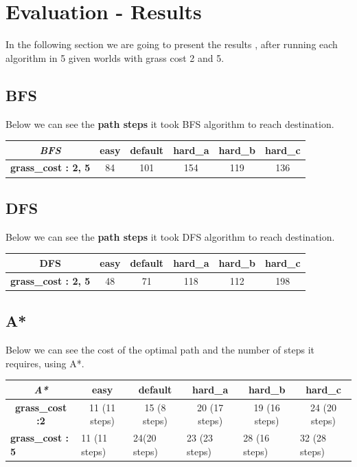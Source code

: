 \documentclass{article}
\begin{document}
    
\section{Evaluation - Results}
    In the following section we are going to present the results , after running each algorithm in 5 given worlds with grass cost 2 and 5.
\subsection{BFS}   
Below we can see the \textbf{path steps} it took BFS algorithm to reach destination.
\begin{table}[!htb]
\centering
\begin{tabular}{|c|c|c|c|c|c|}
\hline
\textit{\textbf{BFS}} & \textbf{easy} & \textbf{default} & \textbf{hard\_a} & \textbf{hard\_b} & \textbf{hard\_c} \\ \hline
\textbf{grass\_cost : 2, 5} & 84 & 101 & 154 & 119 & 136 \\ \hline
\end{tabular}
\end{table}

\subsection{DFS}
Below we can see the \textbf{path steps} it took DFS algorithm to reach destination.

\begin{table}[!htb]
\centering
\begin{tabular}{|c|c|c|c|c|c|}
\hline
\textbf{DFS}              & \textbf{easy} & \textbf{default} & \textbf{hard\_a} & \textbf{hard\_b} & \textbf{hard\_c} \\ \hline
\textbf{grass\_cost : 2, 5} & 48            & 71               & 118              & 112              & 198              \\ \hline
\end{tabular}
\end{table}
\subsection{A*}
Below we can see the cost of the optimal path and the number of steps it requires, using A*.
\begin{table}[!htb]
\centering
\begin{tabular}{|c|c|c|c|c|c|}
\hline
\textit{\textbf{A*}} & \textbf{easy} & \textbf{default} & \textbf{hard\_a} & \textbf{hard\_b} & \textbf{hard\_c} \\ \hline
\textbf{grass\_cost :2} & 11 (11 steps) & 15 (8 steps) & 20 (17 steps) & 19 (16 steps) & 24 (20 steps) \\ \hline
\multicolumn{1}{|l|}{\textbf{grass\_cost : 5}} & \multicolumn{1}{l|}{11 (11 steps)} & \multicolumn{1}{l|}{24(20 steps)} & \multicolumn{1}{l|}{23 (23 steps)} & \multicolumn{1}{l|}{28 (16 steps)} & \multicolumn{1}{l|}{32 (28 steps)} \\ \hline
\end{tabular}
\end{table}
\end{document}
